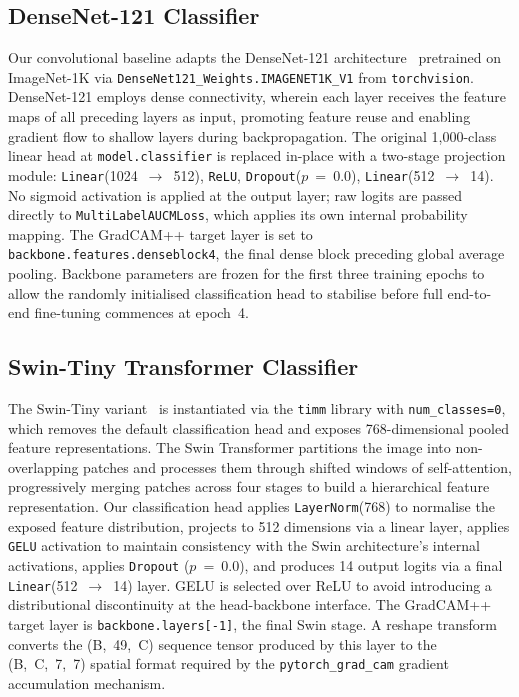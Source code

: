 \documentclass[conference]{IEEEtran}
\begin{document}
\subsection{DenseNet-121 Classifier}

Our convolutional baseline adapts the DenseNet-121
architecture~\cite{huang2017} pretrained on ImageNet-1K via
\texttt{DenseNet121\_Weights.IMAGENET1K\_V1} from \texttt{torchvision}.
DenseNet-121 employs dense connectivity, wherein each layer receives
the feature maps of all preceding layers as input, promoting feature
reuse and enabling gradient flow to shallow layers during backpropagation.
The original 1,000-class linear head at \texttt{model.classifier}
is replaced in-place with a two-stage projection module:
\texttt{Linear}(1024~$\rightarrow$~512), \texttt{ReLU},
\texttt{Dropout}($p$~=~0.0), \texttt{Linear}(512~$\rightarrow$~14).
No sigmoid activation is applied at the output layer; raw logits are
passed directly to \texttt{MultiLabelAUCMLoss}, which applies its own
internal probability mapping. The GradCAM++ target layer is set to
\texttt{backbone.features.denseblock4}, the final dense block preceding
global average pooling. Backbone parameters are frozen for the first
three training epochs to allow the randomly initialised classification
head to stabilise before full end-to-end fine-tuning commences at
epoch~4.

\subsection{Swin-Tiny Transformer Classifier}

The Swin-Tiny variant~\cite{liu2021} is instantiated via the
\texttt{timm} library with \texttt{num\_classes=0}, which removes the
default classification head and exposes 768-dimensional pooled feature
representations. The Swin Transformer partitions the image into
non-overlapping patches and processes them through shifted windows of
self-attention, progressively merging patches across four stages to
build a hierarchical feature representation. Our classification head
applies \texttt{LayerNorm}(768) to normalise the exposed feature
distribution, projects to 512 dimensions via a linear layer, applies
\texttt{GELU} activation to maintain consistency with the Swin
architecture's internal activations, applies \texttt{Dropout}
($p$~=~0.0), and produces 14 output logits via a final
\texttt{Linear}(512~$\rightarrow$~14) layer. GELU is selected over
ReLU to avoid introducing a distributional discontinuity at the
head-backbone interface. The GradCAM++ target layer is
\texttt{backbone.layers[-1]}, the final Swin stage. A reshape
transform converts the (B,~49,~C) sequence tensor produced by this
layer to the (B,~C,~7,~7) spatial format required by the
\texttt{pytorch\_grad\_cam} gradient accumulation mechanism.
\end{document}
